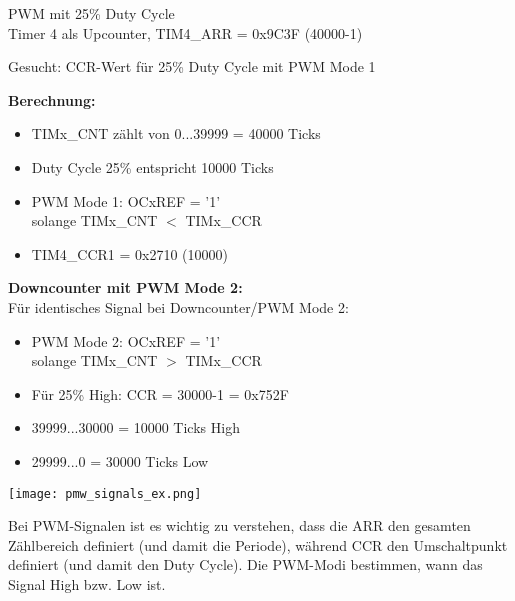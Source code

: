 \begin{example2}{PWM mit 25\% Duty Cycle}\\
    Timer 4 als Upcounter, TIM4\_ARR = 0x9C3F (40000-1)
    
    Gesucht: CCR-Wert für 25\% Duty Cycle mit PWM Mode 1
    
    \tcblower
    \begin{minipage}{0.6\linewidth}
    \textbf{Berechnung:}
    \begin{itemize}
        \item TIMx\_CNT zählt von 0...39999 = 40000 Ticks
        \item Duty Cycle 25\% entspricht 10000 Ticks
        \item PWM Mode 1: OCxREF = '1' \\ solange TIMx\_CNT $<$ TIMx\_CCR
        \item TIM4\_CCR1 = 0x2710 (10000)
    \end{itemize}
    
    \textbf{Downcounter mit PWM Mode 2:}\\
    Für identisches Signal bei Downcounter/PWM Mode 2:
    \begin{itemize}
        \item PWM Mode 2: OCxREF = '1' \\ solange TIMx\_CNT $>$ TIMx\_CCR
        \item Für 25\% High: CCR = 30000-1 = 0x752F
        \item 39999...30000 = 10000 Ticks High
        \item 29999...0 = 30000 Ticks Low
    \end{itemize}
    \end{minipage}
    \begin{minipage}{0.4\linewidth}
        \texttt{[image: pmw\_signals\_ex.png]}
    \end{minipage}
\end{example2}

\begin{remark}
    Bei PWM-Signalen ist es wichtig zu verstehen, dass die ARR den gesamten Zählbereich definiert (und damit die Periode), während CCR den Umschaltpunkt definiert (und damit den Duty Cycle). Die PWM-Modi bestimmen, wann das Signal High bzw. Low ist.
\end{remark}


